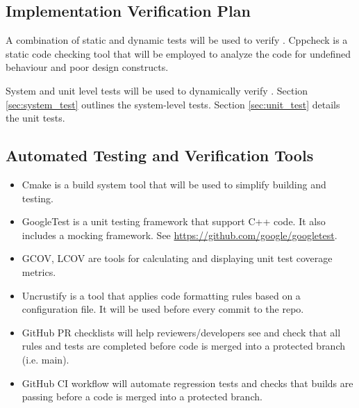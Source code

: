 \documentclass[12pt, titlepage]{article}
\begin{document}
\subsection{Implementation Verification Plan}

A combination of static and dynamic tests will be used to verify \progname{}. Cppcheck
\citep{cppcheck} is a static code checking tool that will be employed to analyze the code for
undefined behaviour and poor design constructs.

System and unit level tests will be used to dynamically verify \progname{}. Section
\ref{sec:system_test} outlines the system-level tests. Section \ref{sec:unit_test} details the unit
tests.


\subsection{Automated Testing and Verification Tools}

\begin{itemize}
    \item Cmake \citep{cmake} is a build system tool that will be used to simplify building and
    testing.
    \item GoogleTest is a unit testing framework that support C++ code. It also includes a mocking
    framework. See \url{https://github.com/google/googletest}.
    \item GCOV, LCOV are tools for calculating and displaying unit test coverage metrics.
    \item Uncrustify is a tool that applies code formatting rules based on a configuration file. It
    will be used before every commit to the repo.
    \item GitHub PR checklists will help reviewers/developers see and check that all rules and tests
    are completed before code is merged into a protected branch (i.e. main).
    \item GitHub CI workflow will automate regression tests and checks that \progname{} builds are
    passing before a code is merged into a protected branch.
\end{itemize}

\end{document}
